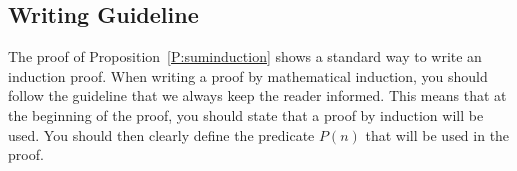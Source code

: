 \subsection*{Writing Guideline}
The proof of Proposition~\ref{P:suminduction} shows a standard way to write an induction proof.  When writing a proof by mathematical induction, you should follow the guideline that we always keep the reader informed.  This means that at the beginning of the proof, you should state that a proof by induction will be used. You should then clearly define the predicate $P ( n )$ that will be used in the proof.
\hbreak

\endinput
